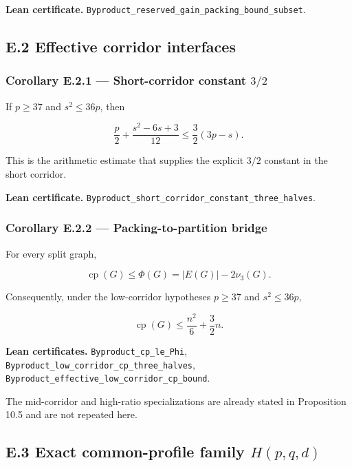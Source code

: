 \documentclass[
  american,
  11pt,
  a4paper,
]{article}
\begin{document}
\textbf{Lean certificate.} \texttt{Byproduct\_reserved\_gain\_packing\_bound\_subset}.

\subsection{E.2 Effective corridor interfaces}\label{e.2-effective-corridor-interfaces}

\subsubsection{\texorpdfstring{Corollary E.2.1 --- Short-corridor constant \(3/2\)}{Corollary E.2.1 --- Short-corridor constant 3/2}}\label{corollary-e.2.1-short-corridor-constant-32}

If \(p\ge37\) and \(s^2\le36p\), then

\[
\frac p2+\frac{s^2-6s+3}{12}
\le
\frac32(3p-s).
\]

This is the arithmetic estimate that supplies the explicit \(3/2\) constant in the short corridor.

\textbf{Lean certificate.} \texttt{Byproduct\_short\_corridor\_constant\_three\_halves}.

\subsubsection{Corollary E.2.2 --- Packing-to-partition bridge}\label{corollary-e.2.2-packing-to-partition-bridge}

For every split graph,

\[
\operatorname{cp}(G)\le \Phi(G)=|E(G)|-2\nu_3(G).
\]

Consequently, under the low-corridor hypotheses \(p\ge37\) and \(s^2\le36p\),

\[
\operatorname{cp}(G)\le \frac{n^2}{6}+\frac32n.
\]

\textbf{Lean certificates.} \texttt{Byproduct\_cp\_le\_Phi}, \texttt{Byproduct\_low\_corridor\_cp\_three\_halves}, \texttt{Byproduct\_effective\_low\_corridor\_cp\_bound}.

The mid-corridor and high-ratio specializations are already stated in Proposition 10.5 and are not repeated here.

\subsection{\texorpdfstring{E.3 Exact common-profile family \(H(p,q,d)\)}{E.3 Exact common-profile family H(p,q,d)}}\label{e.3-exact-common-profile-family-hpqd}
\end{document}
